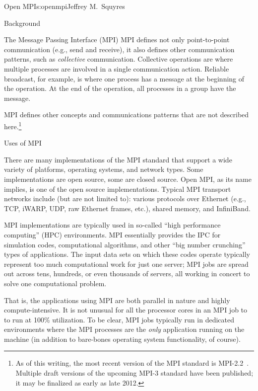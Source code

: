 \begin{aosachapter}{Open MPI}{s:openmpi}{Jeffrey M.\ Squyres}
\begin{aosasect1}{Background}
\begin{aosasect2}{The Message Passing Interface (MPI)}
MPI defines not only point-to-point communication (e.g., send and
receive), it also defines other communication patterns, such as {\em
  collective} communication.  Collective operations are where multiple
processes are involved in a single communication action.  Reliable
broadcast, for example, is where one process has a message at the
beginning of the operation. At the end of the operation, all processes
in a group have the message.

MPI defines other concepts and communications patterns that are not
described here.\footnote{As of this writing, the most recent version
  of the MPI standard is MPI-2.2~\cite{mpi-2.2}.  Multiple draft
  versions of the upcoming MPI-3 standard have been published; it may
  be finalized as early as late 2012.}

\end{aosasect2}


\begin{aosasect2}{Uses of MPI}

There are many implementations of the MPI standard that support a
wide variety of platforms, operating systems, and network types.
Some implementations are open source, some are closed source.  
%
Open MPI, as its name implies, is one of the open source
implementations.
%
Typical MPI transport networks include (but are not limited to):
various protocols over Ethernet (e.g., TCP, iWARP, UDP, raw Ethernet
frames, etc.), shared memory, and InfiniBand.

MPI implementations are typically used in so-called ``high performance
computing'' (HPC) environments.  MPI essentially provides the IPC for
simulation codes, computational algorithms, and other ``big number
crunching'' types of applications.  The input data sets on which these
codes operate typically represent too much computational work for just
one server; MPI jobs are spread out across tens, hundreds, or even
thousands of servers, all working in concert to solve one
computational problem.

That is, the applications using MPI are both parallel in nature and
highly compute-intensive.  It is not unusual for all the processor
cores in an MPI job to to run at 100\% utilization.  To be clear, MPI
jobs typically run in dedicated environments where the MPI processes
are the {\em only} application running on the machine (in addition to
bare-bones operating system functionality, of course).


\end{aosasect2}
\end{aosasect1}
\end{aosachapter}
